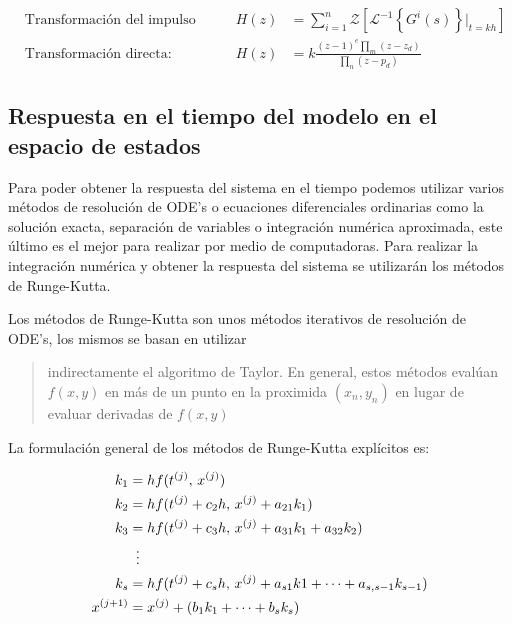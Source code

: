             \begin{align}
                &\text{Transformación del impulso invariante:}& H(z) &= \sum_{i=1}^{n}\mathcal{Z} \left[ \mathcal{L}^{-1}\left\lbrace G^{i}(s)\right\rbrace\Bigr|_{t=kh}\right] \label{eq:impulsinal}\\[15pt]
                &\text{Transformación directa:}& H(z) &=  k \frac{(z-1)^e\displaystyle\prod_m (z-z_d)}{\displaystyle\prod_n (z-p_d)} \label{eq:directa}
            \end{align}

    
    \subsection{Respuesta en el tiempo del modelo en el espacio de estados}
        
        Para poder obtener la respuesta del sistema en el tiempo podemos utilizar varios métodos de resolución de ODE's o ecuaciones diferenciales ordinarias como la solución exacta, separación de variables o integración numérica aproximada, este último es el mejor para realizar por medio de computadoras. Para realizar la integración numérica y obtener la respuesta del sistema se utilizarán los métodos de Runge-Kutta.

        Los métodos de Runge-Kutta son unos métodos iterativos de resolución de ODE's, los mismos se basan en utilizar \blockquote[{\cite[p.31]{horacio1997metodos}}]{indirectamente el algoritmo de Taylor. En general, estos métodos evalúan $f(x,y)$ en más de un punto en la proximida $(x_n,y_n)$ en lugar de evaluar derivadas de $f(x,y)$}. La formulación general de los métodos de Runge-Kutta explícitos es:    
        
        \begin{equation}\label{eq:RKgeneral}
            \begin{aligned}
                k_1 &= hf(t^{(j)},\,x^{(j)})\\
                k_2 &= hf(t^{(j)} + c_2 h,\,x^{(j)} + a_{21}k_1)\\
                k_3 &= hf(t^{(j)} + c_3 h,\,x^{(j)} + a_{31}k_1 + a_{32}k_2)\\
                &\mathrel{\makebox[\widthof{=}]{\vdots}}\\
                k_s &= hf(t^{(j)} + c_s h,\,x^{(j)} + a_{s1}k1 + \cdots +  a_{s,s-1}k_{s-1})\\
                x^{(j+1)} &= x^{(j)} + (b_1 k_1 + \cdots + b_s k_s)
            \end{aligned}
        \end{equation}
        

